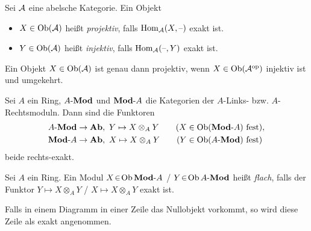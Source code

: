 \documentclass{cheat-sheet}
\newcommand{\AMod}{\text{$A$-$\Mod$}} %
\newcommand{\ModA}{\text{$\Mod$-$A$}} %
\begin{document}
\begin{defn}
  Sei $\mathcal{A}$ eine abelsche Kategorie. Ein Objekt
  \begin{itemize}
    \item $X \in \operatorname{Ob}(\mathcal{A})$ heißt \emph{projektiv}, falls $\operatorname{Hom}_{\mathcal{A}}(X, \text{--})$ exakt ist.
    \item $Y \in \operatorname{Ob}(\mathcal{A})$ heißt \emph{injektiv}, falls $\operatorname{Hom}_{\mathcal{A}}(\text{--}, Y)$ exakt ist.
  \end{itemize}
\end{defn}

\begin{bem}
  Ein Objekt $X \in \operatorname{Ob}(\mathcal{A})$ ist genau dann projektiv, wenn $X \in \operatorname{Ob}(\mathcal{A}^{\mathrm{op}})$ injektiv ist und umgekehrt.
\end{bem}

\begin{prop}
  Sei $A$ ein Ring, $\AMod$ und $\ModA$ die Kategorien der $A$-Links- bzw. $A$-Rechtsmoduln.
  Dann sind die Funktoren
  \begin{align*}
    \AMod \to \AbGrp, \enspace & Y \mapsto X \otimes_A Y \qquad \text{($X \in \Ob(\ModA)$ fest)}, \\
    \ModA \to \AbGrp, \enspace & X \mapsto X \otimes_A Y \qquad \text{($Y \in \Ob(\AMod)$ fest)}
  \end{align*}
  beide rechts-exakt.
\end{prop}

\begin{defn}
  Sei $A$ ein Ring. Ein Modul $X \!\in\! \Ob \ModA$ / $Y \!\in\! \Ob \AMod$
  heißt \emph{flach}, falls der Funktor $Y \mapsto X \otimes_A Y$ / $X \mapsto X \otimes_A Y$ exakt ist.
\end{defn}

\begin{konv}
  Falls in einem Diagramm in einer Zeile das Nullobjekt vorkommt, so wird diese Zeile als exakt angenommen.
\end{konv}
\end{document}
